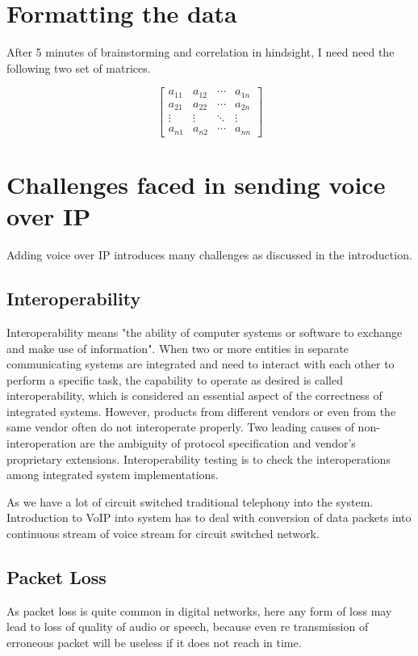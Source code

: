 \documentclass[12pt]{Book}
\begin{document}
	\section{Formatting the data}
	After 5 minutes of brainstorming and correlation in hindsight, I need need the following two set of 
matrices.
	
	\[\begin{bmatrix}
	a_{11}&a_{12}&\cdots &a_{1n} \\
	a_{21}&a_{22}&\cdots &a_{2n} \\
	\vdots & \vdots & \ddots & \vdots\\
	a_{n1}&a_{n2}&\cdots &a_{nn}
	\end{bmatrix}\]	
    \section{Challenges faced in sending voice over IP}
    Adding voice over IP introduces many challenges as discussed in the introduction.
    \subsection{Interoperability}
    Interoperability means "the ability of computer systems or software to exchange and make use of information". When two or more entities in separate communicating systems are integrated and need to interact with each other to perform a specific task, the capability to operate as desired is called interoperability, which is considered an essential aspect of the correctness of integrated systems. However, products from different vendors or even from the same vendor often do not interoperate properly. Two leading causes of non-interoperation are the ambiguity of protocol specification and vendor’s proprietary extensions. Interoperability testing is to check the interoperations among integrated system implementations.\par
    As we have a lot of circuit switched traditional telephony into the system. Introduction to VoIP into system has to deal with conversion of data packets into continuous stream of voice stream for circuit switched network. 
    \subsection{Packet Loss}
    As packet loss is quite common in digital networks, here any form of loss may lead to loss of quality of audio or speech, because even re transmission of erroneous packet will be useless if it does not reach in time.
\end{document}
